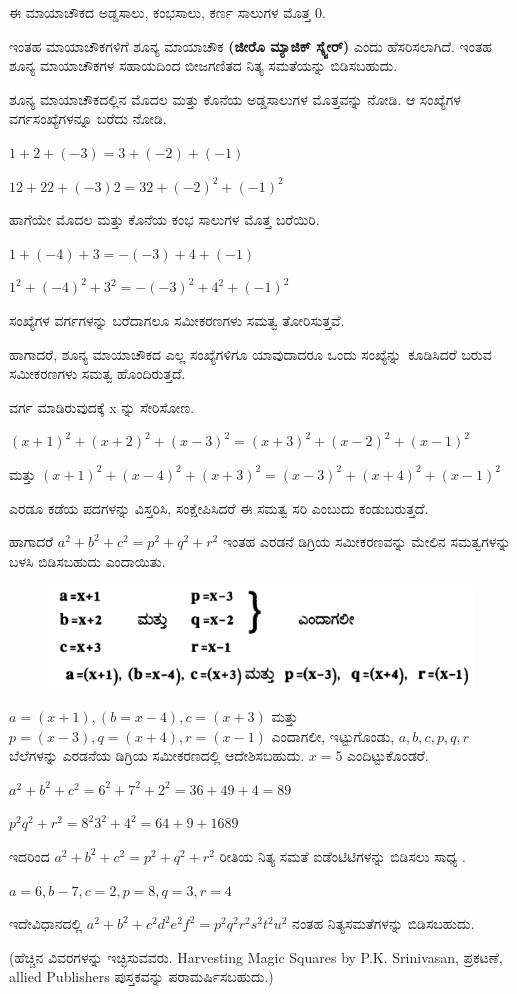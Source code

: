 ಈ ಮಾಯಾಚೌಕದ ಅಡ್ಡಸಾಲು, ಕಂಭಸಾಲು, ಕರ್ಣ ಸಾಲುಗಳ ಮೊತ್ತ 0.

ಇಂತಹ ಮಾಯಾಚೌಕಗಳಿಗೆ ಶೂನ್ಯ ಮಾಯಾಚೌಕ \textbf{(ಜೀರೊ ಮ್ಯಾಜಿಕ್ ಸ್ಕ್ವೇರ್)} \linebreak ಎಂದು ಹೆಸರಿಸಲಾಗಿದೆ. ಇಂತಹ ಶೂನ್ಯ ಮಾಯಾಚೌಕಗಳ ಸಹಾಯದಿಂದ ಬೀಜಗಣಿತದ ನಿತ್ಯ ಸಮತೆಯನ್ನು ಬಿಡಿಸಬಹುದು.

ಶೂನ್ಯ ಮಾಯಾಚೌಕದಲ್ಲಿನ ಮೊದಲ ಮತ್ತು ಕೊನೆಯ ಅಡ್ಡಸಾಲುಗಳ ಮೊತ್ತವನ್ನು ನೋಡಿ. ಆ ಸಂಖ್ಯೆಗಳ ವರ್ಗಸಂಖ್ಯೆಗಳನ್ನೂ ಬರೆದು ನೋಡಿ.

$1+2+(-3) =3+(-2)+(-1)$

$12+22+(-3) 2 =32+(-2)^2 +(-1)^2$

ಹಾಗೆಯೇ ಮೊದಲ ಮತ್ತು ಕೊನೆಯ ಕಂಭ ಸಾಲುಗಳ ಮೊತ್ತ ಬರೆಯಿರಿ.

$1+(-4)+3 = -(-3)+4+(-1)$

$1^2+(-4)^2 +3^2 =-(-3)^2+4^2 +(-1)^2$

ಸಂಖ್ಯೆಗಳ ವರ್ಗಗಳನ್ನು ಬರೆದಾಗಲೂ ಸಮೀಕರಣಗಳು ಸಮತ್ವ ತೋರಿಸುತ್ತವೆ.

ಹಾಗಾದರೆ, ಶೂನ್ಯ ಮಾಯಾಚೌಕದ ಎಲ್ಲ ಸಂಖ್ಯೆಗಳಿಗೂ ಯಾವುದಾದರೂ ಒಂದು \hbox{ಸಂಖ್ಯೆನ್ನು ಕೂಡಿಸಿದರೆ} ಬರುವ ಸಮೀಕರಣಗಳು ಸಮತ್ವ ಹೊಂದಿರುತ್ತದೆ.

ವರ್ಗ ಮಾಡಿರುವುದಕ್ಕೆ x ನ್ನು ಸೇರಿಸೋಣ.

$(x+1)^2+(x+2)^2+(x-3)^2 = (x+3)^2+(x-2)^2+(x-1)^2$

ಮತ್ತು $(x+1)^2+(x-4)^2+(x+3)^2 = (x-3)^2+(x+4)^2+(x-1)^2$

ಎರಡೂ ಕಡೆಯ ಪದಗಳನ್ನು ವಿಸ್ತರಿಸಿ, ಸಂಕ್ಷೇಪಿಸಿದರೆ ಈ ಸಮತ್ವ ಸರಿ ಎಂಬುದು ಕಂಡುಬರುತ್ತದೆ.

ಹಾಗಾದರೆ $a^2+b^2+c^2 = p^2+q^2+r^2$ ಇಂತಹ ಎರಡನೆ ಡಿಗ್ರಿಯ \hbox{ಸಮೀಕರಣವನ್ನು} ಮೇಲಿನ ಸಮತ್ವಗಳನ್ನು ಬಳಸಿ ಬಿಡಿಸಬಹುದು ಎಂದಾಯಿತು.
\begin{figure}[H]
\includegraphics[scale=.9]{src/figures/chap10/fig10-3.jpg}
\end{figure}

$a=(x+1), (b=x-4), c=(x+3)$ ಮತ್ತು $p=(x-3), q=(x+4), r=(x-1)$ ಎಂದಾಗಲೀ, ಇಟ್ಟುಗೊಂಡು, $a, b, c, p, q, r$ ಬೆಲೆಗಳನ್ನು ಎರಡನೆಯ ಡಿಗ್ರಿಯ ಸಮೀಕರಣದಲ್ಲಿ ಆದೇಶಿಸಬಹುದು. $x=5$ ಎಂದಿಟ್ಟುಕೊಂಡರೆ.

$a^2 +b^2+c^2= 6^2 + 7^2 + 2^2 = 36 +49 +4=89$

$p^2 q^2 + r^2 = 8^2 3^2 +4^2 = 64 +9 + 16 89$

ಇದರಿಂದ $a^2+b^2+c^2 = p^2+q^2+r^2$ ರೀತಿಯ ನಿತ್ಯ ಸಮತೆ ಐಡೆಂಟಿಟಿಗಳನ್ನು ಬಿಡಿಸಲು ಸಾಧ್ಯ .

$a=6, b-7, c=2, p=8, q=3, r=4$

ಇದೇವಿಧಾನದಲ್ಲಿ $a^2 +b^2 +c^2 d^2 e^2 f^2 = p^2 q^2 r^2 s^2 t^2 u^2$ ನಂತಹ \hbox{ನಿತ್ಯಸಮತೆಗಳನ್ನು} ಬಿಡಿಸಬಹುದು.

(ಹೆಚ್ಚಿನ ವಿವರಗಳನ್ನು ಇಚ್ಛಿಸುವವರು. Harvesting Magic Squares by P.K. Srinivasan, ಪ್ರಕಟಣೆ, allied Publishers ಪುಸ್ತಕವನ್ನು ಪರಾಮರ್ಷಿಸಬಹುದು.)
